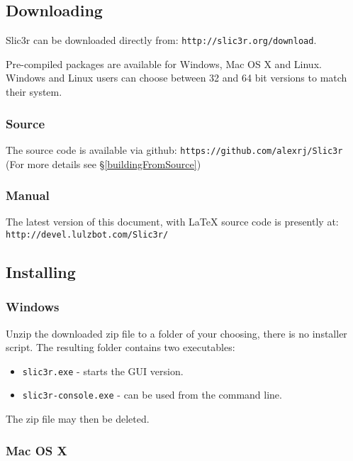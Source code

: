 
\subsection{Downloading}

Slic3r can be downloaded directly from: \texttt{http://slic3r.org/download}.

Pre-compiled packages are available for Windows, Mac OS X and Linux.  Windows and Linux users can choose between 32 and 64 bit versions to match their system.

\subsubsection{Source}
The source code is available via github: \texttt{https://github.com/alexrj/Slic3r} (For more details see §\ref{buildingFromSource})

\subsubsection{Manual}
The latest version of this document, with {\LaTeX} source code is presently at: \texttt{http://devel.lulzbot.com/Slic3r/}


\subsection{Installing}

\subsubsection{Windows}

Unzip the downloaded zip file to a folder of your choosing, there is no installer script. The resulting folder contains two executables:
\begin{itemize}
\item \texttt{slic3r.exe} - starts the GUI version.
\item \texttt{slic3r-console.exe} - can be used from the command line.
\end{itemize}

The zip file may then be deleted.

\subsubsection{Mac OS X}

